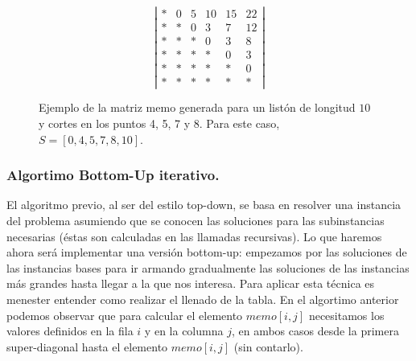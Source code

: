 \begin{figure}[h!]
	\begin{center}
		\begin{minipage}[c]{.85\textwidth}
			\begin{center} 
				\[ \left| \begin{array}{cccccc}
				* & 0 & 5 & 10 & 15 & 22 \\
				* & * & 0 & 3  & 7 & 12 \\
				* & * & * & 0  & 3 & 8 \\
				* & * & * & *  & 0 & 3 \\
				* & * & * & *  & * & 0 \\
				* & * & * & *  & * & * \end{array} \right|\]

			  \caption{Ejemplo de la matriz memo generada para un list\'on de longitud $10$ y cortes en los puntos 4, 5, 7 y 8. Para este caso, $S = [0,4,5,7,8,10]$.}
			\end{center}
		\end{minipage}
	\end{center}
\end{figure}

\subsubsection{Algortimo Bottom-Up iterativo.}
El algoritmo previo, al ser del estilo top-down, se basa en resolver una instancia del problema asumiendo que se conocen 
las soluciones para las subinstancias necesarias (\'estas son calculadas en las llamadas recursivas). Lo que haremos ahora 
ser\'a implementar una versi\'on bottom-up: empezamos por las soluciones de las instancias bases para ir armando gradualmente 
las soluciones de las instancias m\'as grandes hasta llegar a la que nos interesa.
Para aplicar esta t\'ecnica es menester entender como realizar el llenado de la tabla. En el algortimo anterior podemos observar 
que para calcular el elemento $memo[i, j]$ necesitamos los valores definidos en la fila $i$ y en la columna $j$, en ambos casos 
desde la primera super-diagonal hasta el elemento $memo[i, j]$ (sin contarlo).


